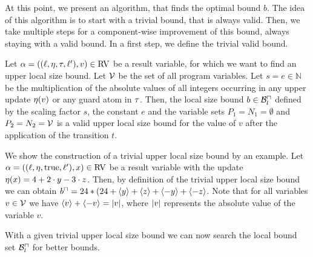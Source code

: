 At this point, we present an algorithm, that finds the optimal bound $b$.
The idea of this algorithm is to start with a trivial bound, that is always valid.
Then, we take multiple steps for a component-wise improvement of this bound, always staying with a valid bound.
In a first step, we define the trivial valid bound.

\begin{definition}
  Let $\alpha = ((\ell,\eta,\tau,\ell'),v) \in \text{RV}$ be a result variable, for which we want to find an upper local size bound.
  Let $\mathcal{V}$ be the set of all program variables.
  Let $s = e \in \mathbb{N}$ be the multiplication of the absolute values of all integers occurring in any upper update $\eta(v)$ or any guard atom in $\tau$.
  Then, the local size bound $b \in \mathcal{B}^\sqcap_l$ defined by the scaling factor $s$, the constant $e$ and the variable sets $P_1 = N_1 = \emptyset$ and $P_2 = N_2 = \mathcal{V}$ is a valid upper local size bound for the value of $v$ after the application of the transition $t$.
\end{definition}



We show the construction of a trivial upper local size bound by an example.
Let $\alpha = ((\ell,\eta,\text{true},\ell'),x) \in \text{RV}$ be a result variable with the update $\eta(x) = 4 + 2 \cdot y - 3 \cdot z$.
Then, by definition of the trivial upper local size bound we can obtain $b^\sqcap = 24 * (24 + \langle y\rangle + \langle z\rangle + \langle-y\rangle + \langle-z\rangle$.
Note that for all variables $v \in \mathcal{V}$ we have $\langle v\rangle + \langle-v\rangle = \left|v\right|$, where $\left|v\right|$ represents the absolute value of the variable $v$.

With a given trivial upper local size bound we can now search the local bound set $\mathcal{B}^\sqcap_l$ for better bounds.

